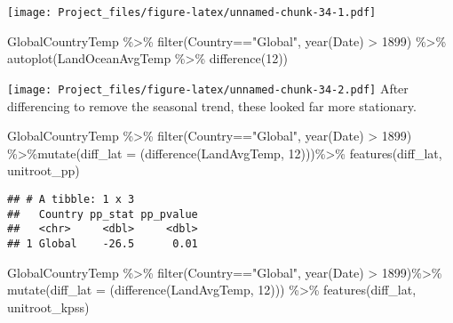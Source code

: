 \documentclass[
]{article}
\newenvironment{Shaded}{\begin{snugshade}}{\end{snugshade}}
\newcommand{\AttributeTok}[1]{\textcolor[rgb]{0.77,0.63,0.00}{#1}}
\newcommand{\DecValTok}[1]{\textcolor[rgb]{0.00,0.00,0.81}{#1}}
\newcommand{\FunctionTok}[1]{\textcolor[rgb]{0.00,0.00,0.00}{#1}}
\newcommand{\NormalTok}[1]{#1}
\newcommand{\SpecialCharTok}[1]{\textcolor[rgb]{0.00,0.00,0.00}{#1}}
\newcommand{\StringTok}[1]{\textcolor[rgb]{0.31,0.60,0.02}{#1}}
\begin{document}
\texttt{[image: Project\_files/figure-latex/unnamed-chunk-34-1.pdf]}

\begin{Shaded}
\begin{Highlighting}[]
\NormalTok{GlobalCountryTemp }\SpecialCharTok{\%\textgreater{}\%}  \FunctionTok{filter}\NormalTok{(Country}\SpecialCharTok{==}\StringTok{"Global"}\NormalTok{,  }\FunctionTok{year}\NormalTok{(Date) }\SpecialCharTok{\textgreater{}} \DecValTok{1899}\NormalTok{) }\SpecialCharTok{\%\textgreater{}\%} 
\FunctionTok{autoplot}\NormalTok{(LandOceanAvgTemp }\SpecialCharTok{\%\textgreater{}\%} \FunctionTok{difference}\NormalTok{(}\DecValTok{12}\NormalTok{))}
\end{Highlighting}
\end{Shaded}

\texttt{[image: Project\_files/figure-latex/unnamed-chunk-34-2.pdf]}
After differencing to remove the seasonal trend, these looked far more
stationary.

\begin{Shaded}
\begin{Highlighting}[]
\NormalTok{GlobalCountryTemp }\SpecialCharTok{\%\textgreater{}\%} \FunctionTok{filter}\NormalTok{(Country}\SpecialCharTok{==}\StringTok{"Global"}\NormalTok{,  }\FunctionTok{year}\NormalTok{(Date) }\SpecialCharTok{\textgreater{}} \DecValTok{1899}\NormalTok{)  }\SpecialCharTok{\%\textgreater{}\%}\FunctionTok{mutate}\NormalTok{(}\AttributeTok{diff\_lat =}\NormalTok{ (}\FunctionTok{difference}\NormalTok{(LandAvgTemp, }\DecValTok{12}\NormalTok{)))}\SpecialCharTok{\%\textgreater{}\%}
  \FunctionTok{features}\NormalTok{(diff\_lat, unitroot\_pp)}
\end{Highlighting}
\end{Shaded}

\begin{verbatim}
## # A tibble: 1 x 3
##   Country pp_stat pp_pvalue
##   <chr>     <dbl>     <dbl>
## 1 Global    -26.5      0.01
\end{verbatim}

\begin{Shaded}
\begin{Highlighting}[]
\NormalTok{GlobalCountryTemp }\SpecialCharTok{\%\textgreater{}\%} \FunctionTok{filter}\NormalTok{(Country}\SpecialCharTok{==}\StringTok{"Global"}\NormalTok{,  }\FunctionTok{year}\NormalTok{(Date) }\SpecialCharTok{\textgreater{}} \DecValTok{1899}\NormalTok{)}\SpecialCharTok{\%\textgreater{}\%} \FunctionTok{mutate}\NormalTok{(}\AttributeTok{diff\_lat =}\NormalTok{ (}\FunctionTok{difference}\NormalTok{(LandAvgTemp, }\DecValTok{12}\NormalTok{))) }\SpecialCharTok{\%\textgreater{}\%}
  \FunctionTok{features}\NormalTok{(diff\_lat, unitroot\_kpss)}
\end{Highlighting}
\end{Shaded}
\end{document}

